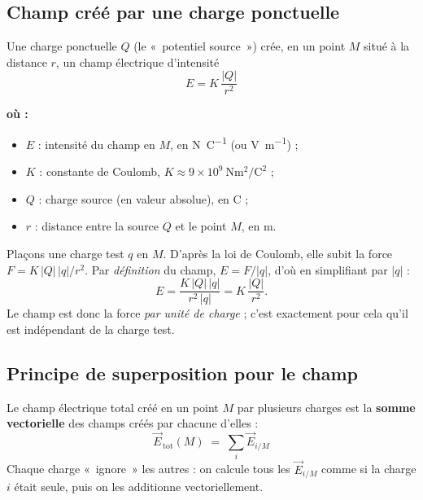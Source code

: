 \documentclass[11pt,a4paper]{article}
\newenvironment{ou}{%
  \par\smallskip\noindent\textbf{où :}\nopagebreak
  \begin{itemize}[leftmargin=1.8em,topsep=2pt,itemsep=1.5pt,parsep=0pt]}%
  {\end{itemize}}
\newcommand{\vc}[1]{\vec{#1}}
\newcommand{\E}[2]{\vc{E}_{#1/#2}}     %
\begin{document}
\subsection{Champ créé par une charge ponctuelle}

\begin{formule}
Une charge ponctuelle $Q$ (le «~potentiel source~») crée, en un point $M$ situé à la distance $r$,
un champ électrique d'intensité
\[ \boxed{\,E = K\,\dfrac{|Q|}{r^{2}}\,} \]
\begin{ou}
  \item $E$ : intensité du champ en $M$, en \si{\newton\per\coulomb} (ou \si{\volt\per\metre}) ;
  \item $K$ : constante de Coulomb, $K\approx 9\times 10^{9}\ \si{\newton\metre\squared\per\coulomb\squared}$ ;
  \item $Q$ : charge source (en valeur absolue), en \si{\coulomb} ;
  \item $r$ : distance entre la source $Q$ et le point $M$, en \si{\metre}.
\end{ou}
\end{formule}

\begin{remarque}
Plaçons une charge test $q$ en $M$. D'après la loi de Coulomb, elle subit la force
$F = K\,|Q|\,|q|/r^{2}$. Par \emph{définition} du champ, $E = F/|q|$, d'où en simplifiant par
$|q|$ :
\[ E = \frac{K\,|Q|\,|q|}{r^{2}\,|q|} = K\,\frac{|Q|}{r^{2}}. \]
Le champ est donc la force \emph{par unité de charge} ; c'est exactement pour cela qu'il est
indépendant de la charge test.
\end{remarque}

\subsection{Principe de superposition pour le champ}

\begin{theoreme}
Le champ électrique total créé en un point $M$ par plusieurs charges est la \textbf{somme
vectorielle} des champs créés par chacune d'elles :
\[ \boxed{\;\vc{E}_{\,\text{tot}}(M) \;=\; \sum_{i} \E{i}{M}\;} \]
Chaque charge «~ignore~» les autres : on calcule tous les $\E{i}{M}$ comme si la charge $i$ était
seule, puis on les additionne vectoriellement.
\end{theoreme}
\end{document}
